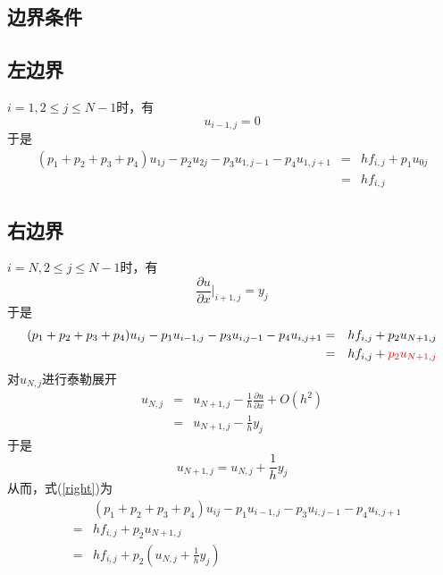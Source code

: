 \documentclass[a4paper,left=2.5cm,right=2.5cm]{article}
\begin{document}
\begin{spacing}{1.6}
	\section{边界条件}
	
	\subsection{左边界}
	$i=1, 2\le j\le N-1$时，有
	\begin{equation}
	u_{i-1,j} = 0
	\end{equation}
	于是
	\begin{eqnarray}
	(p_1+p_2+p_3+p_4)u_{1j} - p_2u_{2j} - p_3u_{1,j-1} -p_4u_{1,j+1} &=& hf_{i,j} + p_1u_{0j} \\
	&=& hf_{i,j}
	\end{eqnarray}
	\subsection{右边界}
	$i=N,2\le j \le N-1$时，有
	\begin{equation}
	\frac{\partial u}{\partial x}\big|_{i+1,j} = y_{j}
	\end{equation}
	于是
	\begin{eqnarray}
	(p_1+p_2+p_3+p_4)u_{ij} - p_1u_{i-1,j} - p_3u_{i,j-1} - p_4u_{i,j+1} &=&hf_{i,j}+p_2u_{N+1,j}\label{right}\\
	&=& hf_{i,j} + {\color{red}p_2u_{N+1,j}}
	\end{eqnarray}
	对$u_{N,j}$进行泰勒展开
	\begin{eqnarray}
	u_{N,j} &=& u_{N+1,j} - \frac{1}{h}\frac{\partial u}{\partial x} + O(h^2) \\
	&=&u_{N+1,j} - \frac{1}{h}y_j
	\end{eqnarray}
	于是
	\begin{equation}
	u_{N+1,j} = u_{N,j} + \frac{1}{h}y_j \label{taylorright}
	\end{equation}
	从而，式(\ref{right})为
	\begin{eqnarray}
	&&(p_1+p_2+p_3+p_4)u_{ij} - p_1u_{i-1,j} - p_3u_{i,j-1} - p_4u_{i,j+1}\\ &=&hf_{i,j}+p_2u_{N+1,j}\\
	&=&hf_{i,j}+p_2(u_{N,j} + \frac{1}{h}y_j)
	\end{eqnarray}

\end{spacing}
\end{document}
